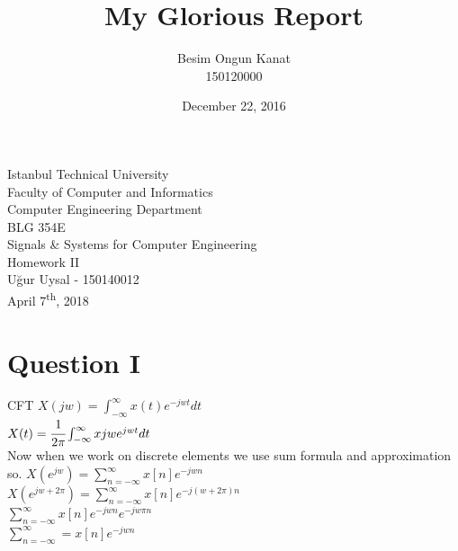 \documentclass[a4paper, 12pt, titlepage]{article}
\title{My Glorious Report}
\author{Besim Ongun Kanat \\ 150120000}
\date{December 22, 2016}
\begin{document}


\begin{titlepage}
	\begin{center}
		\large{Istanbul Technical University \\ Faculty of Computer and Informatics \\ Computer Engineering Department} \\
		\vspace{150pt}
		\Large{BLG 354E \\Signals \& Systems for Computer Engineering  \\Homework II}  \\
		\vspace{30pt}
		\large{Uğur Uysal - 150140012} \\
		\vspace{\fill} %
		\large{April 7\textsuperscript{th}, 2018}
	\end{center}
\end{titlepage}
\newpage
\tableofcontents
\newpage

\section{Question I}
CFT
$ X(jw) =  \int_{-\infty}^{\infty} x(t) e^{-jwt} dt $ \\
$ X(t) = \cfrac{1}{2\pi} \int_{-\infty}^{\infty}  x jw e^{jwt}dt $\\
Now when we work on discrete elements we use sum formula and approximation so.
$ X(e^{jw}) = \sum_{n= -\infty}^{\infty}x[n]e^{-jwn}$\\
$ X(e^{jw + 2\pi}) = \sum_{n= -\infty}^{\infty}x[n]e^{-j(w+2\pi)n}$ \\
$ \sum_{n=-\infty}^{\infty} x[n]e^{-jwn}e^{-jw\pi n} $\\
$ \sum_{n=-\infty}^{\infty} = x[n]e^{-jwn} $
\end{document}
